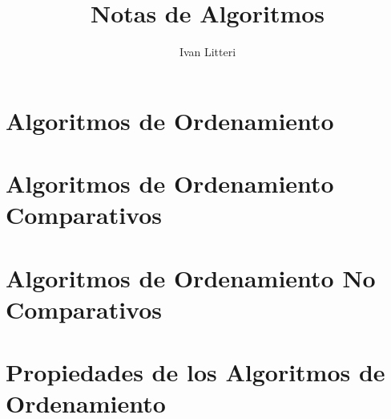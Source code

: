 \documentclass{article}
\title{Notas de Algoritmos}
\author{Ivan Litteri}
\date{}
\begin{document}
\maketitle
\lstset{language=Python}

% 

\section*{Algoritmos de Ordenamiento}


\section*{Algoritmos de Ordenamiento Comparativos}


\section*{Algoritmos de Ordenamiento No Comparativos}


\section*{Propiedades de los Algoritmos de Ordenamiento}

\end{document}
